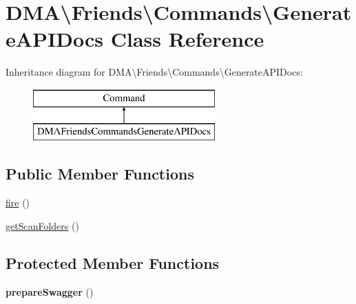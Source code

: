 \hypertarget{classDMA_1_1Friends_1_1Commands_1_1GenerateAPIDocs}{}\section{D\+M\+A\textbackslash{}Friends\textbackslash{}Commands\textbackslash{}Generate\+A\+P\+I\+Docs Class Reference}
\label{classDMA_1_1Friends_1_1Commands_1_1GenerateAPIDocs}
Inheritance diagram for D\+M\+A\textbackslash{}Friends\textbackslash{}Commands\textbackslash{}Generate\+A\+P\+I\+Docs\+:\begin{figure}[H]
\begin{center}
\leavevmode
\includegraphics[height=2.000000cm]{d3/d2f/classDMA_1_1Friends_1_1Commands_1_1GenerateAPIDocs}
\end{center}
\end{figure}
\subsection*{Public Member Functions}
\begin{DoxyCompactItemize}
\item 
\hyperlink{classDMA_1_1Friends_1_1Commands_1_1GenerateAPIDocs_aedce176f0424d4ae2ac76a3ffec7f846}{fire} ()
\item 
\hyperlink{classDMA_1_1Friends_1_1Commands_1_1GenerateAPIDocs_a04f5ba96f15f950cd1b1e80f670e4b09}{get\+Scan\+Folders} ()
\end{DoxyCompactItemize}
\subsection*{Protected Member Functions}
\begin{DoxyCompactItemize}
\item 
\hypertarget{classDMA_1_1Friends_1_1Commands_1_1GenerateAPIDocs_aaa5239299e6c056219f8edbab31de040}{}{\bfseries prepare\+Swagger} ()\label{classDMA_1_1Friends_1_1Commands_1_1GenerateAPIDocs_aaa5239299e6c056219f8edbab31de040}

\end{DoxyCompactItemize}
